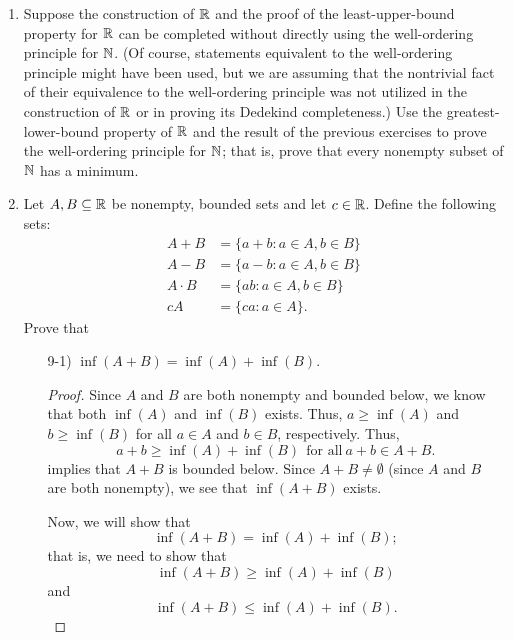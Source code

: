 \documentclass[11pt,a4paper]{article}
\begin{document}
\begin{enumerate}
\item Suppose the construction of \( \mathbb{R}  \) and the proof of the least-upper-bound property for \( \mathbb{R}  \) can be completed without directly using the well-ordering principle for \( \mathbb{N}  \). (Of course, statements equivalent to the well-ordering principle might have been used, but we are assuming that the nontrivial fact of their equivalence to the well-ordering principle was not utilized in the construction of \( \mathbb{R}  \) or in proving its Dedekind completeness.) Use the greatest-lower-bound property of \( \mathbb{R}  \) and the result of the previous exercises to prove the well-ordering principle for \( \mathbb{N}  \); that is, prove that every nonempty subset of \( \mathbb{N}  \) has a minimum.




\item Let \( A, B \subseteq \mathbb{R}  \) be nonempty, bounded sets and let \( c \in \mathbb{R}  \). Define the following sets:
    \begin{align*}
        A + B &= \{ a + b : a \in A, b \in B \}  \\
        A - B &= \{ a - b : a \in A , b \in B  \}  \\
        A \cdot B &= \{ ab : a \in A, b \in B \} \\
        cA &= \{ ca: a \in A \}.
    \end{align*}
    Prove that 
    \begin{enumerate}
        \item[9-1)] \( \inf(A + B) = \inf(A) + \inf(B) \).
            \begin{proof}
                Since \( A  \) and \( B  \) are both nonempty and bounded below, we know that both \( \inf(A) \) and \( \inf(B) \) exists. Thus, \( a \geq \inf(A) \) and \( b \geq \inf(B) \) for all \( a \in A  \) and \( b \in B  \), respectively. Thus, 
                \[  a + b \geq \inf(A) + \inf(B) \ \ \text{for all} \ a + b \in A + B. \]
                implies that \( A + B  \) is bounded below. Since \( A + B \neq \emptyset  \) (since \( A  \) and \( B  \) are both nonempty), we see that \( \inf(A+B)  \) exists.

                Now, we will show that 
                \[  \inf(A+B) = \inf(A) + \inf(B);  \]
                that is, we need to show that 
                \[  \inf(A+B) \geq \inf(A) + \inf(B) \tag{1}  \]
                and 
                \[  \inf(A+B) \leq \inf(A) + \inf(B). \tag{2} \]


\end{proof}
\end{enumerate}
\end{enumerate}
\end{document}
